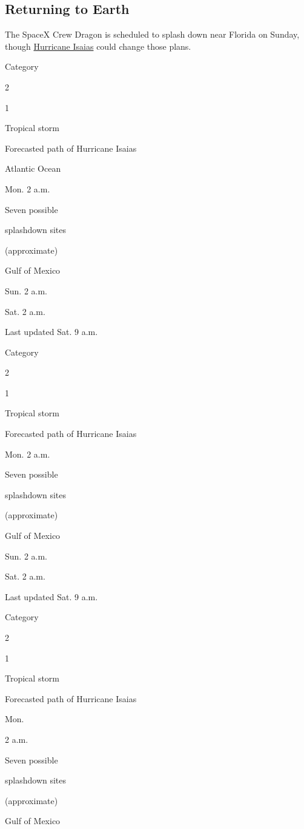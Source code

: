 \hypertarget{returning-to-earth}{%
\subsection{Returning to Earth}\label{returning-to-earth}}

The SpaceX Crew Dragon is scheduled to splash down near Florida on
Sunday, though
\href{https://www.nytimes3xbfgragh.onion/interactive/2020/07/31/us/hurricane-isaias-tracker-map.html}{Hurricane
Isaias} could change those plans.

Category

2

1

Tropical storm

Forecasted path of Hurricane Isaias

Atlantic Ocean

Mon. 2 a.m.

Seven possible

splashdown sites

(approximate)

Gulf of Mexico

Sun. 2 a.m.

Sat. 2 a.m.

Last updated Sat. 9 a.m.

Category

2

1

Tropical storm

Forecasted path of Hurricane Isaias

Mon. 2 a.m.

Seven possible

splashdown sites

(approximate)

Gulf of Mexico

Sun. 2 a.m.

Sat. 2 a.m.

Last updated Sat. 9 a.m.

Category

2

1

Tropical storm

Forecasted path of Hurricane Isaias

Mon.

2 a.m.

Seven possible

splashdown sites

(approximate)

Gulf of Mexico

